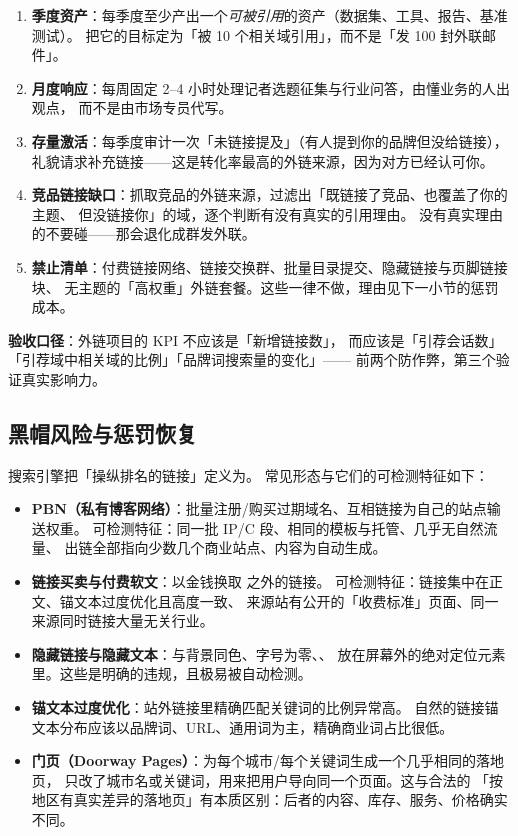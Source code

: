 \begin{toolbox}[外链建设的可执行节奏]
\begin{enumerate}
  \item \textbf{季度资产}：每季度至少产出一个\emph{可被引用}的资产（数据集、工具、报告、基准测试）。
        把它的目标定为「被 10 个相关域引用」，而不是「发 100 封外联邮件」。
  \item \textbf{月度响应}：每周固定 2--4 小时处理记者选题征集与行业问答，由懂业务的人出观点，
        而不是由市场专员代写。
  \item \textbf{存量激活}：每季度审计一次「未链接提及」（有人提到你的品牌但没给链接），
        礼貌请求补充链接——这是转化率最高的外链来源，因为对方已经认可你。
  \item \textbf{竞品链接缺口}：抓取竞品的外链来源，过滤出「既链接了竞品、也覆盖了你的主题、
        但没链接你」的域，逐个判断有没有真实的引用理由。
        没有真实理由的不要碰——那会退化成群发外联。
  \item \textbf{禁止清单}：付费链接网络、链接交换群、批量目录提交、隐藏链接与页脚链接块、
        无主题的「高权重」外链套餐。这些一律不做，理由见下一小节的惩罚成本。
\end{enumerate}
\textbf{验收口径}：外链项目的 KPI 不应该是「新增链接数」，
而应该是「引荐会话数」「引荐域中相关域的比例」「品牌词搜索量的变化」——
前两个防作弊，第三个验证真实影响力。
\end{toolbox}

\subsection{黑帽风险与惩罚恢复}

搜索引擎把「操纵排名的链接」定义为。
常见形态与它们的可检测特征如下：

\begin{itemize}
  \item \textbf{PBN（私有博客网络）}：批量注册/购买过期域名、互相链接为自己的站点输送权重。
        可检测特征：同一批 IP/C 段、相同的模板与托管、几乎无自然流量、
        出链全部指向少数几个商业站点、内容为自动生成。
  \item \textbf{链接买卖与付费软文}：以金钱换取 之外的链接。
        可检测特征：链接集中在正文、锚文本过度优化且高度一致、
        来源站有公开的「收费标准」页面、同一来源同时链接大量无关行业。
  \item \textbf{隐藏链接与隐藏文本}：与背景同色、字号为零、、
        放在屏幕外的绝对定位元素里。这些是明确的违规，且极易被自动检测。
  \item \textbf{锚文本过度优化}：站外链接里精确匹配关键词的比例异常高。
        自然的链接锚文本分布应该以品牌词、URL、通用词为主，精确商业词占比很低。
  \item \textbf{门页（Doorway Pages）}：为每个城市/每个关键词生成一个几乎相同的落地页，
        只改了城市名或关键词，用来把用户导向同一个页面。这与合法的
        「按地区有真实差异的落地页」有本质区别：后者的内容、库存、服务、价格确实不同。
\end{itemize}

